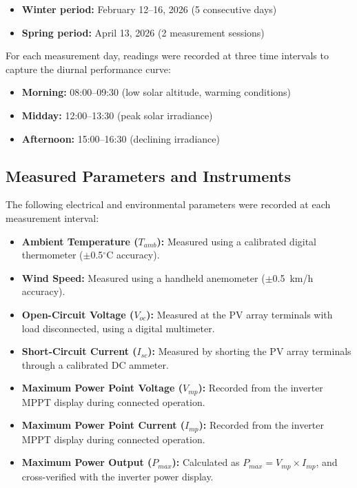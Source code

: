 \begin{itemize}
    \item \textbf{Winter period:} February 12--16, 2026 (5 consecutive days)
    \item \textbf{Spring period:} April 13, 2026 (2 measurement sessions)
\end{itemize}

For each measurement day, readings were recorded at three time intervals to capture the diurnal performance curve:

\begin{itemize}
    \item \textbf{Morning:} 08:00--09:30 (low solar altitude, warming conditions)
    \item \textbf{Midday:} 12:00--13:30 (peak solar irradiance)
    \item \textbf{Afternoon:} 15:00--16:30 (declining irradiance)
\end{itemize}

\subsection{Measured Parameters and Instruments}

The following electrical and environmental parameters were recorded at each measurement interval:

\begin{itemize}
    \item \textbf{Ambient Temperature ($T_{amb}$):} Measured using a calibrated digital thermometer ($\pm$0.5$^{\circ}$C accuracy).
    \item \textbf{Wind Speed:} Measured using a handheld anemometer ($\pm$0.5~km/h accuracy).
    \item \textbf{Open-Circuit Voltage ($V_{oc}$):} Measured at the PV array terminals with load disconnected, using a digital multimeter.
    \item \textbf{Short-Circuit Current ($I_{sc}$):} Measured by shorting the PV array terminals through a calibrated DC ammeter.
    \item \textbf{Maximum Power Point Voltage ($V_{mp}$):} Recorded from the inverter MPPT display during connected operation.
    \item \textbf{Maximum Power Point Current ($I_{mp}$):} Recorded from the inverter MPPT display during connected operation.
    \item \textbf{Maximum Power Output ($P_{max}$):} Calculated as $P_{max} = V_{mp} \times I_{mp}$, and cross-verified with the inverter power display.
\end{itemize}


